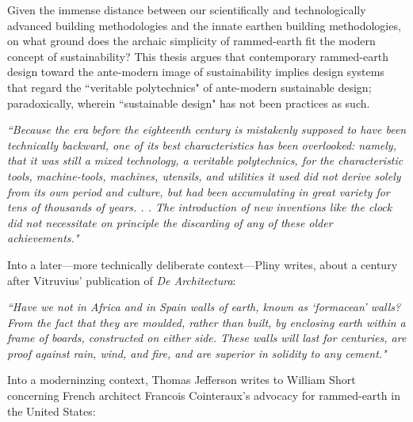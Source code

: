 Given the immense distance between our scientifically and technologically advanced building methodologies and the innate earthen building methodologies, on what ground does the archaic simplicity of rammed-earth fit the modern concept of sustainability? This thesis argues that contemporary rammed-earth design toward the ante-modern image of sustainability implies design systems that regard the ``veritable polytechnics" of ante-modern sustainable design; paradoxically, wherein ``sustainable design" has not been practices as such.

\begin{flushright}
\small{
\textit{
``Because the era before the eighteenth century is mistakenly supposed to have been technically backward, one of its best characteristics has been overlooked: namely, that it was still a mixed technology, a veritable polytechnics, for the characteristic tools, machine-tools, machines, utensils, and utilities it used did not derive solely from its own period and culture, but had been accumulating in great variety for tens of thousands of years. . . The introduction of new inventions like the clock did not necessitate on principle the discarding of any of these older achievements." \cite[p.134]{PENTAGON}}}
\end{flushright}

\clearpage

Into a later---more technically deliberate context---Pliny writes, about a century after Vitruvius' publication of \textit{De Architectura}:

\begin{flushright}
\small{
\textit{``Have we not in Africa and in Spain walls of earth, known as `formacean' walls? From the fact that they are moulded, rather than built, by enclosing earth within a frame of boards, constructed on either side. These walls will last for centuries, are proof against rain, wind, and fire, and are superior in solidity to any cement."}} \cite[p385]{NATHISTORY}
\end{flushright}

Into a moderninzing context, Thomas Jefferson writes to William Short concerning French architect Francois Cointeraux's advocacy for rammed-earth in the United States:

